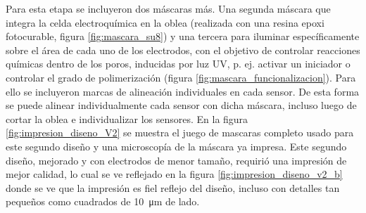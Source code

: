 				 Para esta etapa se incluyeron dos máscaras más. Una segunda máscara que integra la celda electroquímica en la oblea (realizada con una resina epoxi fotocurable, figura \ref{fig:mascara_su8}) y una tercera para iluminar específicamente sobre el área de cada uno de los electrodos, con el objetivo de controlar reacciones químicas dentro de los poros, inducidas por luz UV, p. ej. activar un iniciador o controlar el grado de polimerización  (figura \ref{fig:mascara_funcionalizacion}).\cite{Andrieu-Brunsen2015,Herzog2015,Silies2015} Para ello se incluyeron marcas de alineación individuales en cada sensor. De esta forma se puede alinear individualmente cada sensor con dicha máscara, incluso luego de cortar la oblea e individualizar los sensores. En la figura \ref{fig:impresion_diseno_V2} se muestra el juego de mascaras completo usado para este segundo diseño y una microscopía de la máscara ya impresa. Este segundo diseño, mejorado y con electrodos de menor tamaño, requirió una impresión de mejor calidad, lo cual se ve reflejado en la figura \ref{fig:impresion_diseno_v2_b} donde se ve que la impresión es fiel reflejo del diseño, incluso con detalles tan pequeños como cuadrados de \SI{10}{\um} de lado. 

